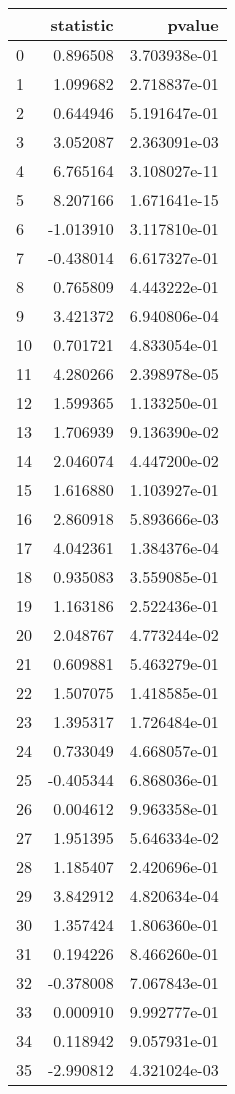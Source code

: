 \begin{tabular}{lrr}
\toprule
{} &  statistic &        pvalue \\
\midrule
0  &   0.896508 &  3.703938e-01 \\
1  &   1.099682 &  2.718837e-01 \\
2  &   0.644946 &  5.191647e-01 \\
3  &   3.052087 &  2.363091e-03 \\
4  &   6.765164 &  3.108027e-11 \\
5  &   8.207166 &  1.671641e-15 \\
6  &  -1.013910 &  3.117810e-01 \\
7  &  -0.438014 &  6.617327e-01 \\
8  &   0.765809 &  4.443222e-01 \\
9  &   3.421372 &  6.940806e-04 \\
10 &   0.701721 &  4.833054e-01 \\
11 &   4.280266 &  2.398978e-05 \\
12 &   1.599365 &  1.133250e-01 \\
13 &   1.706939 &  9.136390e-02 \\
14 &   2.046074 &  4.447200e-02 \\
15 &   1.616880 &  1.103927e-01 \\
16 &   2.860918 &  5.893666e-03 \\
17 &   4.042361 &  1.384376e-04 \\
18 &   0.935083 &  3.559085e-01 \\
19 &   1.163186 &  2.522436e-01 \\
20 &   2.048767 &  4.773244e-02 \\
21 &   0.609881 &  5.463279e-01 \\
22 &   1.507075 &  1.418585e-01 \\
23 &   1.395317 &  1.726484e-01 \\
24 &   0.733049 &  4.668057e-01 \\
25 &  -0.405344 &  6.868036e-01 \\
26 &   0.004612 &  9.963358e-01 \\
27 &   1.951395 &  5.646334e-02 \\
28 &   1.185407 &  2.420696e-01 \\
29 &   3.842912 &  4.820634e-04 \\
30 &   1.357424 &  1.806360e-01 \\
31 &   0.194226 &  8.466260e-01 \\
32 &  -0.378008 &  7.067843e-01 \\
33 &   0.000910 &  9.992777e-01 \\
34 &   0.118942 &  9.057931e-01 \\
35 &  -2.990812 &  4.321024e-03 \\
\bottomrule
\end{tabular}
